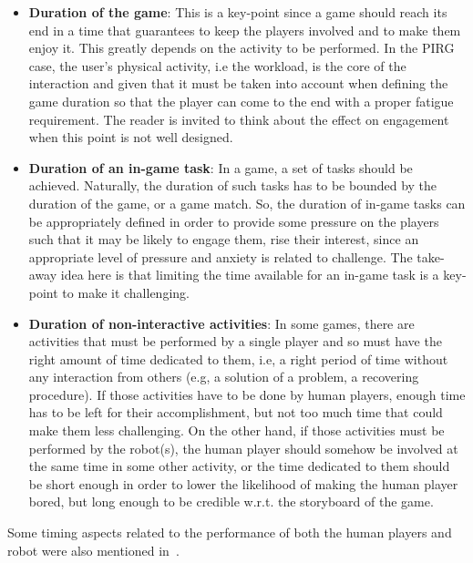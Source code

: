 \begin{itemize}
\item \textbf{Duration of the game}: This is a key-point since a game should reach its end in a time that guarantees to keep the players involved and to make them enjoy it. This greatly depends on the activity to be performed. In the PIRG case, the user's physical activity, i.e the workload, is the core of the interaction and given that it must be taken into account when defining the game duration so that the player can come to the end with a proper fatigue requirement. The reader is invited to think about the effect on engagement when this point is not well designed.

\item \textbf{Duration of an in-game task}: In a game, a set of tasks should be achieved. Naturally, the duration of such tasks has to be bounded by the duration of the game, or a game match. So, the duration of in-game tasks can be appropriately defined in order to provide some pressure on the players such that it may be likely to engage them, rise their interest, since an appropriate level of pressure and anxiety is related to challenge. The take-away idea here is that limiting the time available for an in-game task is a key-point to make it challenging.

\item \textbf{Duration of non-interactive activities}: In some games, there are activities that must be performed by a single player and so must have the right amount of time dedicated to them, i.e, a right period of time without any interaction from others (e.g, a solution of a problem, a recovering procedure). If those activities have to be done by human players, enough time has to be left for their accomplishment, but not too much time that could make them less challenging. On the other hand, if those activities must be performed by the robot(s), the human player should somehow be involved at the same time in some other activity, or the time dedicated to them should be short enough in order to lower the likelihood of making the human player bored, but long enough to be credible w.r.t. the storyboard of the game.
\end{itemize}

Some timing aspects related to the performance of both the human players and robot were also mentioned in~\cite{bonarini_timing_2014}.

